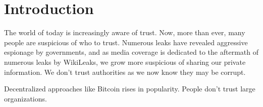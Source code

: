 \section{Introduction}\label{cha:introduction}

The world of today is increasingly aware of trust. Now, more than ever, many people are suspicious of who to trust. Numerous leaks have revealed aggressive espionage by governments, and as media coverage is dedicated to the aftermath of numerous leaks by WikiLeaks, we grow more suspicious of sharing our private information. We don't trust authorities as we now know they may be corrupt.

Decentralized approaches like Bitcoin rises in popularity. People don't trust large organizations.






